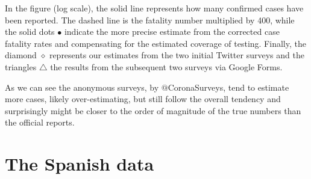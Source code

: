 \documentclass{article}
\begin{document}
In the figure (log scale), the solid line represents how many confirmed cases have been reported. The dashed line is the fatality number multiplied by 400, while the solid dots $\bullet$ indicate the more precise estimate from the corrected case fatality rates and compensating for the estimated coverage of testing. Finally, the diamond $\diamond$ represents our estimates from the two initial Twitter surveys and the triangles $\triangle$ the results from the subsequent two surveys via Google Forms. 

As we can see the anonymous surveys, by $@$CoronaSurveys,  tend to estimate more cases, likely over-estimating, but still follow the overall tendency and surprisingly might be closer to the order of magnitude of the true numbers than the official reports. 

\section{The Spanish data}
\end{document}
